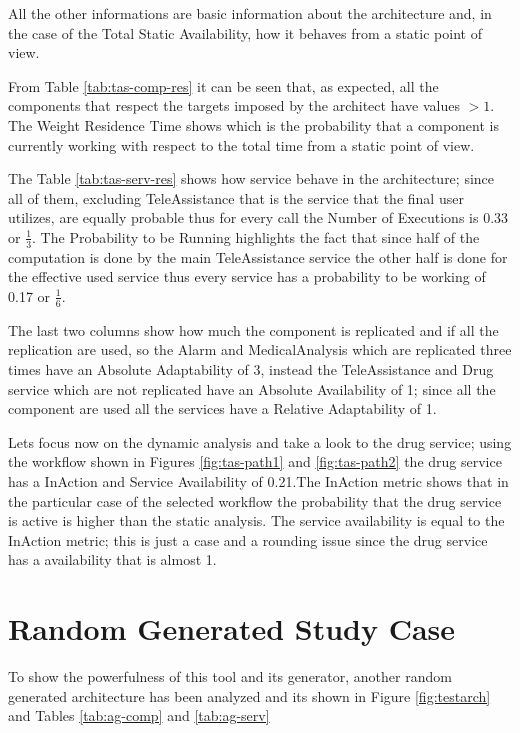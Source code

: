 All the other informations are basic information about the architecture and, in the case of the Total Static Availability, how it behaves from a static point of view.

From Table \ref{tab:tas-comp-res} it can be seen that, as expected, all the components that respect the targets imposed by the architect have values $>1$. The Weight Residence Time shows which is the probability that a component is currently working with respect to the total time from a static point of view.

The Table \ref{tab:tas-serv-res} shows how service behave in the architecture; since all of them, excluding TeleAssistance that is the service that the final user utilizes, are equally probable thus for every call the Number of Executions is 0.33 or $\frac{1}{3}$. The Probability to be Running highlights the fact that since half of the computation is done by the main TeleAssistance service the other half is done for the effective used service thus every service has a probability to be working of 0.17 or $\frac{1}{6}$.

The last two columns show how much the component is replicated and if all the replication are used, so the Alarm and MedicalAnalysis which are replicated three times have an Absolute Adaptability of 3, instead the TeleAssistance and Drug service which are not replicated have an Absolute Availability of 1; since all the component are used all the services have a Relative Adaptability of 1.

Lets focus now on the dynamic analysis and take a look to the drug service; using the workflow shown in Figures \ref{fig:tas-path1} and \ref{fig:tas-path2} the drug service has a InAction and Service Availability of 0.21.The InAction metric shows that in the particular case of the selected workflow the probability that the drug service is active is higher than the static analysis. The service availability is equal to the InAction metric; this is just a case and a rounding issue since the drug service has a availability that is almost 1.
\clearpage

\section{Random Generated Study Case}
To show the powerfulness of this tool and its generator, another random generated architecture has been analyzed and its shown in Figure \ref{fig:testarch} and Tables \ref{tab:ag-comp} and \ref{tab:ag-serv}

